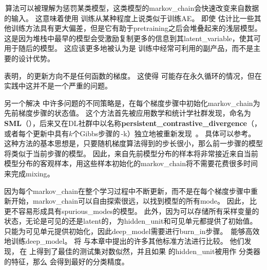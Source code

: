 
\,算法可以被理解为惩罚某类模型，这类模型的\gls{markov_chain}会快速改变来自数据的输入。 %
这意味着使用\,\,训练从某种程度上说类似于训练\gls{AE}。
即使\,\,估计比一些其他训练方法具有更大偏差，但是它有助于\gls{pretraining}之后会堆叠起来的浅层模型。
这是因为堆栈中最早的模型会受激励复制更多的信息到其\gls{latent_variable}，使其可用于随后的模型。
这应该更多地被认为是\,\,训练中经常可利用的副产品，而不是主要的设计优势。


\cite{sutskever2010convergence-small}表明，\,的更新方向不是任何函数的梯度。
这使得\,\,可能存在永久循环的情况，但在实践中这并不是一个严重的问题。


另一个解决\,\,中许多问题的不同策略是，在每个梯度步骤中初始化\gls{markov_chain}为先前梯度步骤的状态值。
这个方法首先被应用数学和统计学社群发现，命名为\textbf{\gls{SML}}（）\citep{Younes98onthe}，后来又在\gls{DL}社群中以名称\textbf{\gls{persistent_contrastive_divergence}}（，或者每个更新中具有$k$个Gibbs步骤的\,-k）独立地被重新发现~\citep{Tieleman08-small}。
具体可以参考。
这种方法的基本思想是，只要随机梯度算法得到的步长很小，那么前一步骤的模型将类似于当前步骤的模型。
因此，来自先前模型分布的样本将非常接近来自当前模型分布的客观样本，用这些样本初始化的\gls{markov_chain}将不需要花费很多时间来完成\gls{mixing}。


因为每个\gls{markov_chain}在整个学习过程中不断更新，而不是在每个梯度步骤中重新开始，\gls{markov_chain}可以自由探索很远，以找到模型的所有\gls{mode}。 
因此，\,比\,\,更不容易形成具有\gls{spurious_modes}的模型。
此外，因为可以存储所有采样变量的状态，无论是可见的还是\gls{latent}的，\,为\gls{hidden_unit}和可见单元都提供了初始值。
\,只能为可见单元提供初始化，因此\gls{deep_model}需要进行\gls{burn_in}步骤。
\,能够高效地训练\gls{deep_model}。
\cite{Marlin10Inductive-small}将\,\,与本章中提出的许多其他标准方法进行比较。
他们发现，\,在\,\,上得到了最佳的测试集对数似然，并且如果\,\,的\gls{hidden_unit}被用作\,\,分类器的特征，那么\,\,会得到最好的分类精度。

